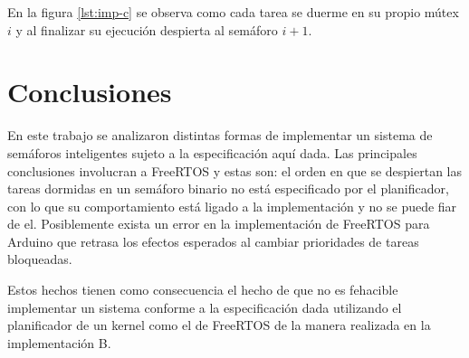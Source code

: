 		En la figura \ref{lst:imp-c} se observa como cada tarea se duerme en su propio mútex $i$ y al finalizar su ejecución despierta al semáforo $i+1$.



\section{Conclusiones} \label{sec:conclusiones}

	En este trabajo se analizaron distintas formas de implementar un sistema de semáforos inteligentes sujeto a la especificación aquí dada.
	Las principales conclusiones involucran a FreeRTOS y estas son: el orden en que se despiertan las tareas dormidas en un semáforo binario no está especificado por el planificador, con lo que su comportamiento está ligado a la implementación y no se puede fiar de el.
	Posiblemente exista un error en la implementación de FreeRTOS para Arduino que retrasa los efectos esperados al cambiar prioridades de tareas bloqueadas.

	Estos hechos tienen como consecuencia el hecho de que no es fehacible implementar un sistema conforme a la especificación dada utilizando el planificador de un kernel como el de FreeRTOS de la manera realizada en la implementación B.

